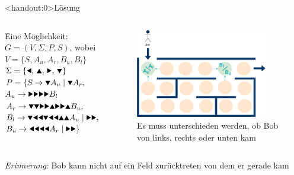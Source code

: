 {
\begin{frame}<handout:0>{Lösung}
    \begin{columns}
        \begin{alertblock}{Eine Möglichkeit:}
            $G = (V, \Sigma, P, S)$, wobei \\
            $V = \{S, A_u, A_r, B_u, B_l\}$ \\
            $\Sigma = \{\text{\Rewind, \MoveUp, \Forward, \MoveDown}\}$ \\
            $P = \{S \rightarrow \text\MoveDown A_u \mid \text\MoveDown A_r,$\\
            \qquad\; $A_u \rightarrow \text{\Forward\Forward\Forward\Forward} B_l$\\
            \qquad\; $A_r \rightarrow \text{\MoveDown\MoveDown\Forward\Forward\MoveUp\Forward\Forward\MoveUp} B_u,$\\
            \qquad\; $B_l \rightarrow \text{\MoveDown\Rewind\Rewind\MoveDown\Rewind\Rewind\MoveUp\MoveUp} A_u \mid \text{\Forward\Forward},$\\
            \qquad\; $B_u \rightarrow \text{\Rewind\Rewind\Rewind\Rewind} A_r \mid \text{\Forward\Forward}\}$
        \end{alertblock}
        \begin{figure}
            \centering
            \includegraphics[width=0.9\textwidth]{../figures/GBeispielHowTo.png}
            \caption{Es muss unterschieden werden, ob Bob von links, rechts oder unten kam}

        \end{figure}
    \end{columns}
    \small\emph{Erinnerung:} Bob kann nicht auf ein Feld zurücktreten von dem er gerade kam
\end{frame}
}

